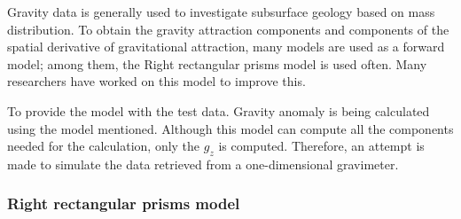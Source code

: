 \documentclass[a4paper,11pt]{article}
\begin{document}
\noindent Gravity data is generally used to investigate subsurface geology based on mass distribution. To obtain the gravity attraction components and components of the spatial derivative of gravitational attraction, many models are used as a forward model; among them, the Right rectangular prisms model is used often. Many researchers have worked on this model to improve this. 

\noindent To provide the model with the test data. Gravity anomaly is being calculated using the model mentioned. Although this model can compute all the components needed for the calculation, only the $g_z$ is computed. Therefore, an attempt is made to simulate the data retrieved from a one-dimensional gravimeter. 

\subsubsection{Right rectangular prisms model} 
\end{document}
